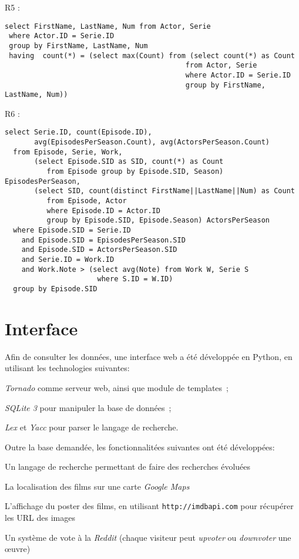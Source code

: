 \documentclass[a4paper,12pt]{article}
\begin{document}
\begin{list}{-}{}
\begin{lstlisting}
    \end{lstlisting}
  \item R5 :
    \begin{lstlisting}
select FirstName, LastName, Num from Actor, Serie
 where Actor.ID = Serie.ID
 group by FirstName, LastName, Num
 having  count(*) = (select max(Count) from (select count(*) as Count
                                           from Actor, Serie
                                           where Actor.ID = Serie.ID
                                           group by FirstName, LastName, Num))
    \end{lstlisting}
  \item R6 :
    \begin{lstlisting}
select Serie.ID, count(Episode.ID), 
       avg(EpisodesPerSeason.Count), avg(ActorsPerSeason.Count)
  from Episode, Serie, Work,
       (select Episode.SID as SID, count(*) as Count
          from Episode group by Episode.SID, Season) EpisodesPerSeason,
       (select SID, count(distinct FirstName||LastName||Num) as Count
          from Episode, Actor
          where Episode.ID = Actor.ID
          group by Episode.SID, Episode.Season) ActorsPerSeason
  where Episode.SID = Serie.ID
    and Episode.SID = EpisodesPerSeason.SID
    and Episode.SID = ActorsPerSeason.SID
    and Serie.ID = Work.ID
    and Work.Note > (select avg(Note) from Work W, Serie S
                      where S.ID = W.ID)
  group by Episode.SID
\end{lstlisting}
\section{Interface}
Afin de consulter les données, une interface web a été développée en
Python, en utilisant les technologies suivantes:
\begin{list}{-}{}
  \item \emph{Tornado} comme serveur web, ainsi que module de templates~;
  \item \emph{SQLite 3} pour manipuler la base de données~;
  \item \emph{Lex} et \emph{Yacc} pour parser le langage de recherche.
\end{list}

Outre la base demandée, les fonctionnalitées suivantes ont été développées:
\begin{list}{-}{}
  \item Un langage de recherche permettant de faire des recherches évoluées
  \item La localisation des films sur une carte \emph{Google Maps}
  \item L'affichage du poster des films, en utilisant
    \texttt{http://imdbapi.com} pour récupérer les URL des images
  \item Un système de vote à la \emph{Reddit} (chaque visiteur peut
    \emph{upvoter} ou \emph{downvoter} une œuvre)
\end{list}

\end{list}
\end{document}
